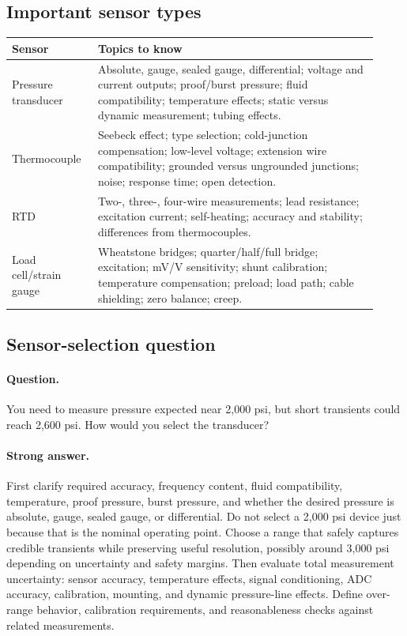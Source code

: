 \documentclass[11pt]{article}
\newcommand{\q}[1]{\paragraph{Question.} #1}
\newcommand{\ans}[1]{\paragraph{Strong answer.} #1}
\begin{document}
\subsection{Important sensor types}
\begin{longtable}{p{0.21\linewidth}p{0.71\linewidth}}
\toprule
\textbf{Sensor} & \textbf{Topics to know} \\
\midrule
Pressure transducer & Absolute, gauge, sealed gauge, differential; voltage and current outputs; proof/burst pressure; fluid compatibility; temperature effects; static versus dynamic measurement; tubing effects. \\
Thermocouple & Seebeck effect; type selection; cold-junction compensation; low-level voltage; extension wire compatibility; grounded versus ungrounded junctions; noise; response time; open detection. \\
RTD & Two-, three-, four-wire measurements; lead resistance; excitation current; self-heating; accuracy and stability; differences from thermocouples. \\
Load cell/strain gauge & Wheatstone bridges; quarter/half/full bridge; excitation; mV/V sensitivity; shunt calibration; temperature compensation; preload; load path; cable shielding; zero balance; creep. \\
\bottomrule
\end{longtable}

\subsection{Sensor-selection question}
\q{You need to measure pressure expected near 2,000 psi, but short transients
could reach 2,600 psi. How would you select the transducer?}

\ans{First clarify required accuracy, frequency content, fluid compatibility,
temperature, proof pressure, burst pressure, and whether the desired pressure is
absolute, gauge, sealed gauge, or differential. Do not select a 2,000 psi device
just because that is the nominal operating point. Choose a range that safely
captures credible transients while preserving useful resolution, possibly around
3,000 psi depending on uncertainty and safety margins. Then evaluate total
measurement uncertainty: sensor accuracy, temperature effects, signal
conditioning, ADC accuracy, calibration, mounting, and dynamic pressure-line
effects. Define over-range behavior, calibration requirements, and reasonableness
checks against related measurements.}
\end{document}
